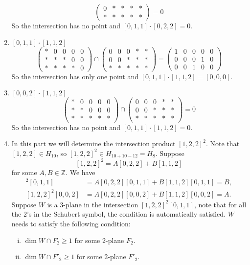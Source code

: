 \documentclass[letterpaper, 12pt]{article}
\begin{document}
\begin{solution}
\begin{enumerate}[(1)]
\[\begin{pmatrix}
   0&*&*&*&*\\ 
   *&*&*&*&*
\end{pmatrix}=0\]
So the intersection has no point and \([0,1,1]\cdot [0,2,2]=0\).
\item \([0,1,1]\cdot [1,1,2]\)
\[\begin{pmatrix}
   *&0&0&0&0\\ 
   *&*&*&0&0\\
   *&*&*&*&0
\end{pmatrix}\cap \begin{pmatrix}
   0&0&0&*&*\\
   0&0&*&*&*\\ 
   *&*&*&*&*
\end{pmatrix}=\begin{pmatrix}
   1&0&0&0&0\\ 
   0&0&0&1&0\\ 
   0&0&1&0&0
\end{pmatrix}\]
So the intersection has only one point and \([0,1,1]\cdot [1,1,2]=[0,0,0]\).
\item \([0,0,2]\cdot [1,1,2]\)
\[\begin{pmatrix}
   *&0&0&0&0\\ 
   *&*&0&0&0\\
   *&*&*&*&*
\end{pmatrix}\cap \begin{pmatrix}
   0&0&0&*&*\\
   0&0&*&*&*\\ 
   *&*&*&*&*
\end{pmatrix}=0\]
So the intersection has no point and \([0,1,1]\cdot [1,1,2]=0\).
\item In this part we will determine the intersection product \([1,2,2]^2\). Note that \([1,2,2]\in H_{10}\), so \([1,2,2]^2\in H_{10+10-12}=H_8\). Suppose 
\[[1,2,2]^2=A[0,2,2]+B[1,1,2]\]
for some \(A,B\in \mathbb{Z}\). We have 
\begin{align*}
    [1,2,2]^2[0,1,1]&=A[0,2,2][0,1,1]+B[1,1,2][0,1,1]=B,\\ 
    [1,2,2]^2[0,0,2]&=A[0,2,2][0,0,2]+B[1,1,2][0,0,2]=A.
\end{align*}
Suppose \(W\) is a \(3\)-plane in the intersection \([1,2,2]^2[0,1,1]\), note that for all the \(2\)'s in the Schubert symbol, the condition is automatically satisfied. \(W\) needs to satisfy the following condition:
\begin{enumerate}[(i)]
\item \(\dim W\cap F_2\geq 1\) for some \(2\)-plane \(F_2\). 
\item \(\dim W\cap F'_2\geq 1\) for some \(2\)-plane \(F'_2\).

\end{enumerate}
\end{enumerate}
\end{solution}
\end{document}

